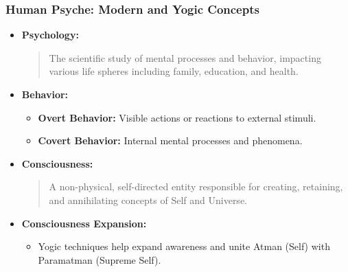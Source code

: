 \begin{frame}[fragile]\frametitle{Human Psyche: Modern and Yogic Concepts}

      \begin{itemize}
        \item \textbf{Psychology:}
        \begin{quote}
        The scientific study of mental processes and behavior, impacting various life spheres including family, education, and health.
        \end{quote}
        \item \textbf{Behavior:}
        \begin{itemize}
            \item \textbf{Overt Behavior:} Visible actions or reactions to external stimuli.
            \item \textbf{Covert Behavior:} Internal mental processes and phenomena.
        \end{itemize}
        \item \textbf{Consciousness:}
        \begin{quote}
        A non-physical, self-directed entity responsible for creating, retaining, and annihilating concepts of Self and Universe.
        \end{quote}
        \item \textbf{Consciousness Expansion:}
        \begin{itemize}
            \item Yogic techniques help expand awareness and unite Atman (Self) with Paramatman (Supreme Self).
        \end{itemize}
      \end{itemize}

\end{frame}

